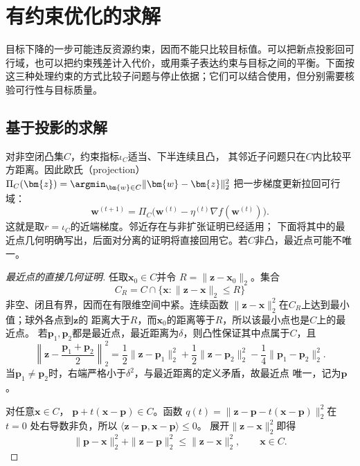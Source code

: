 \section{有约束优化的求解}
\label{sec:opt-constraints-duality-certificates}

目标下降的一步可能违反资源约束，因而不能只比较目标值。可以把新点投影回可行域，也可以把约束残差计入代价，或用乘子表达约束与目标之间的平衡。下面按这三种处理约束的方式比较子问题与停止依据；它们可以结合使用，但分别需要核验可行性与目标质量。

\subsection{基于投影的求解}
\label{sec:opt-projected-methods}

对非空闭凸集$C$，约束指标$\iota_C$适当、下半连续且凸，
其邻近子问题只在$C$内比较平方距离。因此欧氏（projection）
$\Pi_C(\bm{z})=\argmin_{\bm{w}\in C}\lVert\bm{w}-\bm{z}\rVert_2^2$
把一步梯度更新拉回可行域：
\[
  \bm{w}^{(t+1)}
  =\Pi_C\bigl(\bm{w}^{(t)}-\eta^{(t)}\nabla f(\bm{w}^{(t)})\bigr).
\]
这就是取$r=\iota_C$的近端梯度。邻近存在与非扩张证明已经适用；
下面将其中的最近点几何明确写出，后面对分离的证明将直接回用它。若$C$非凸，最近点可能不唯一。

\begin{proof}[最近点的直接几何证明]
任取$\bm{x}_0\in C$并令
$R=\lVert\bm{z}-\bm{x}_0\rVert_2$。集合
\[
  C_R=C\cap\{\bm{x}:\lVert\bm{z}-\bm{x}\rVert_2\leq R\}
\]
非空、闭且有界，因而在有限维空间中紧。连续函数
$\lVert\bm{z}-\bm{x}\rVert_2^2$在$C_R$上达到最小值；球外各点到$\bm{z}$的
距离大于$R$，而$\bm{x}_0$的距离等于$R$，所以该最小点也是$C$上的最近点。
若$\bm{p}_1,\bm{p}_2$都是最近点，最近距离为$\delta$，则凸性保证其中点属于$C$，且
\[
  \left\lVert\bm{z}-\frac{\bm{p}_1+\bm{p}_2}{2}\right\rVert_2^2
  =
  \frac12\lVert\bm{z}-\bm{p}_1\rVert_2^2
  +\frac12\lVert\bm{z}-\bm{p}_2\rVert_2^2
  -\frac14\lVert\bm{p}_1-\bm{p}_2\rVert_2^2.
\]
当$\bm{p}_1\neq\bm{p}_2$时，右端严格小于$\delta^2$，与最近距离的定义矛盾，故最近点
唯一，记为$\bm{p}$。

对任意$\bm{x}\in C$，
$\bm{p}+t(\bm{x}-\bm{p})\in C$。函数
$q(t)=\lVert\bm{z}-\bm{p}-t(\bm{x}-\bm{p})\rVert_2^2$在$t=0$
处右导数非负，所以
$\langle\bm{z}-\bm{p},\bm{x}-\bm{p}\rangle\leq0$。
展开$\|\bm z-\bm x\|_2^2$即得
\begin{equation}
 \|\bm p-\bm x\|_2^2+\|\bm z-\bm p\|_2^2\leq\|\bm z-\bm x\|_2^2,
 \qquad \bm x\in C.
 \label{eq:opt-projection-distance}
\end{equation}
\end{proof}

